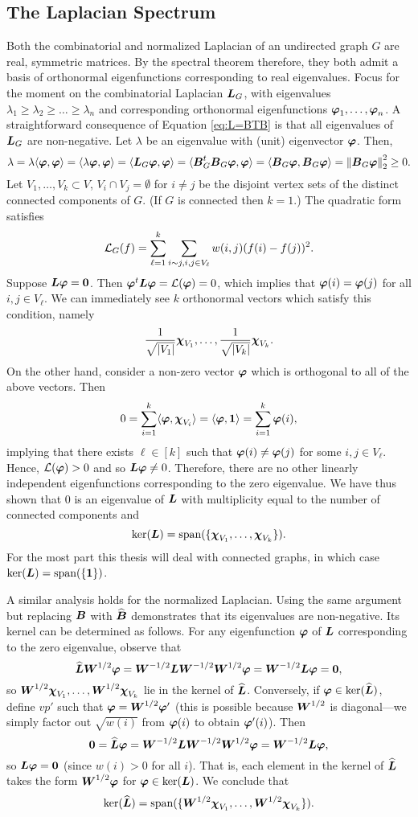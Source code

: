 \subsection{The Laplacian Spectrum}
Both the combinatorial and normalized Laplacian of an undirected graph $G$ are real, symmetric matrices. By the spectral theorem therefore, they both admit a basis of orthonormal eigenfunctions corresponding to real eigenvalues. Focus for the moment on the combinatorial Laplacian  $\vb*{L}_G$, with eigenvalues $\lambda_1\geq \lambda_2\geq \dots \geq \lambda_n$ and corresponding orthonormal eigenfunctions $\vb*{\varphi}_1,\dots,\vb*{\varphi}_n$. A straightforward consequence of Equation \ref{eq:L=BTB} is that all eigenvalues of $\vb*{L}_G$ are non-negative. Let $\lambda$ be an eigenvalue with (unit) eigenvector $\vb*{\varphi}$. Then,  \begin{equation*}
    \lambda = \lambda\langle \vb*{\varphi},\vb*{\varphi}\rangle = \langle \lambda \vb*{\varphi},\vb*{\varphi}\rangle = \langle \vb*{L}_G\vb*{\varphi},\vb*{\varphi}\rangle = \langle \vb*{B}_G^t \vb*{B}_G\vb*{\varphi},\vb*{\varphi}\rangle = \langle \vb*{B}_G\vb*{\varphi},\vb*{B}_G\vb*{\varphi}\rangle =\norm{\vb*{B}_G\vb*{\varphi}}_2^2 \geq 0.
\end{equation*}
Let $V_1,\dots,V_k\subset V$, $V_i\cap V_j= \emptyset$ for $i\neq j$ be the disjoint vertex sets of the distinct connected components of $G$. (If $G$ is connected then $k=1$.) The quadratic form satisfies
\[\mathcal{L}_G(f) = \sum_{\ell=1}^k \sum_{i\sim j, i,j\in V_\ell} w(i,j)(f(i)-f(j))^2. \]
Suppose $\vb*{L}\vb*{\varphi}=\vb{0}$. Then $\vb*{\varphi}^t\vb*{L}\vb*{\varphi}=\mathcal{L}(\vb*{\varphi})=0$, which implies that $\vb*{\varphi}(i)=\vb*{\varphi}(j)$ for all $i,j\in V_\ell$. We can immediately see $k$ orthonormal vectors which satisfy this condition, namely \[\frac{1}{\sqrt{|V_1|}} \boldsymbol{\chi}_{V_1},\dots, \frac{1}{\sqrt{|V_k|}} \boldsymbol{\chi}_{V_k}.\]
On the other hand, consider a non-zero vector $\vb*{\varphi}$ which is orthogonal to all of the above vectors. Then 
\[0=\sum_{i=1}^k \langle \vb*{\varphi},\boldsymbol{\chi}_{V_i}\rangle = \langle \vb*{\varphi},\vb{1} \rangle=\sum_{i=1}^k \vb*{\varphi}(i),\]
implying that there exists $\ell\in[k]$ such that $\vb*{\varphi}(i)\neq\vb*{\varphi}(j)$ for some $i,j\in V_\ell$. Hence, $\mathcal{L}(\vb*{\varphi})>0$ and so $\vb*{L}\vb*{\varphi}\neq 0$. Therefore, there are no other linearly independent eigenfunctions corresponding to the zero eigenvalue.  
We have thus shown that 0 is an eigenvalue of $\vb*{L}$ with multiplicity equal to the number of connected components and 
\[\ker(\vb*{L})=\textnormal{span}(\{\boldsymbol{\chi}_{V_1},\dots,\boldsymbol{\chi}_{V_k}\}).\]
For the most part this thesis will deal with connected graphs, in which case $\ker(\vb*{L})=\textnormal{span}(\{\vb{1}\})$.  

A similar analysis holds for the normalized Laplacian. Using the same argument but replacing $\vb*{B}$ with $\widehat{\vb*{B}}$ demonstrates that its eigenvalues are non-negative. Its kernel can be determined as follows. For any eigenfunction $\vb*{\varphi}$ of $\vb*{L}$ corresponding to the zero eigenvalue, observe that 
\[\widehat{\vb*{L}}\vb*{W}^{1/2}\vb*{\varphi} = \vb*{W}^{-1/2}\vb*{L}\vb*{W}^{-1/2}\vb*{W}^{1/2}\vb*{\varphi} = \vb*{W}^{-1/2}\vb*{L}\vb*{\varphi} = \vb{0},\]
so $\vb*{W}^{1/2}\boldsymbol{\chi}_{V_1},\dots,\vb*{W}^{1/2}\boldsymbol{\chi}_{V_k}$ lie in the kernel of $\widehat{\vb*{L}}$.
Conversely, if $\vb*{\varphi}\in\ker(\widehat{\vb*{L}})$, define $vp'$ such that $\vb*{\varphi}=\vb*{W}^{1/2}\vb*{\varphi}'$ (this is possible because $\vb*{W}^{1/2}$ is diagonal---we simply factor out $\sqrt{w(i)}$ from $\vb*{\varphi}(i)$ to obtain $\vb*{\varphi}'(i)$). Then 
\[\vb{0} =\widehat{\vb*{L}}\vb*{\varphi} = \vb*{W}^{-1/2}\vb*{L} \vb*{W}^{-1/2}\vb*{W}^{1/2}\vb*{\varphi} = \vb*{W}^{-1/2}\vb*{L}\vb*{\varphi},\]
so $\vb*{L}\vb*{\varphi}=\vb{0}$ (since $w(i)>0$ for all $i$). That is, each element in the kernel of $\widehat{\vb*{L}}$ takes the form $\vb*{W}^{1/2}\vb*{\varphi}$ for $\vb*{\varphi}\in\ker(\vb*{L})$. We conclude that 
\[\ker(\widehat{\vb*{L}})=\textnormal{span}(\{\vb*{W}^{1/2}\boldsymbol{\chi}_{V_1},\dots,\vb*{W}^{1/2}\boldsymbol{\chi}_{V_k}\}).\]


